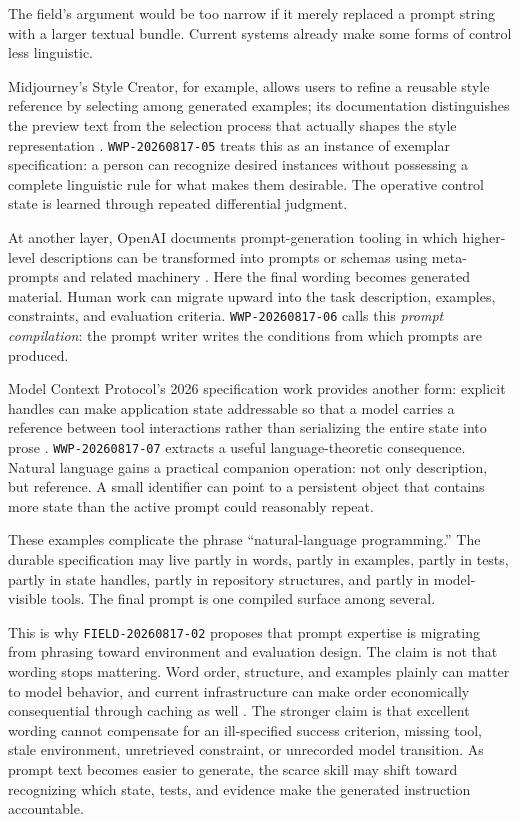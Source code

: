 \documentclass[11pt]{article}
\newcommand{\zettel}[1]{\texttt{#1}}
\begin{document}
The field's argument would be too narrow if it merely replaced a prompt string with a larger textual bundle. Current systems already make some forms of control less linguistic.

Midjourney's Style Creator, for example, allows users to refine a reusable style reference by selecting among generated examples; its documentation distinguishes the preview text from the selection process that actually shapes the style representation \cite{midjourney_style_creator}. \zettel{WWP-20260817-05} treats this as an instance of exemplar specification: a person can recognize desired instances without possessing a complete linguistic rule for what makes them desirable. The operative control state is learned through repeated differential judgment.

At another layer, OpenAI documents prompt-generation tooling in which higher-level descriptions can be transformed into prompts or schemas using meta-prompts and related machinery \cite{openai_prompt_generation}. Here the final wording becomes generated material. Human work can migrate upward into the task description, examples, constraints, and evaluation criteria. \zettel{WWP-20260817-06} calls this \emph{prompt compilation}: the prompt writer writes the conditions from which prompts are produced.

Model Context Protocol's 2026 specification work provides another form: explicit handles can make application state addressable so that a model carries a reference between tool interactions rather than serializing the entire state into prose \cite{soriaparra2026mcp}. \zettel{WWP-20260817-07} extracts a useful language-theoretic consequence. Natural language gains a practical companion operation: not only description, but reference. A small identifier can point to a persistent object that contains more state than the active prompt could reasonably repeat.

These examples complicate the phrase ``natural-language programming.'' The durable specification may live partly in words, partly in examples, partly in tests, partly in state handles, partly in repository structures, and partly in model-visible tools. The final prompt is one compiled surface among several.

This is why \zettel{FIELD-20260817-02} proposes that prompt expertise is migrating from phrasing toward environment and evaluation design. The claim is not that wording stops mattering. Word order, structure, and examples plainly can matter to model behavior, and current infrastructure can make order economically consequential through caching as well \cite{openai_prompt_caching}. The stronger claim is that excellent wording cannot compensate for an ill-specified success criterion, missing tool, stale environment, unretrieved constraint, or unrecorded model transition. As prompt text becomes easier to generate, the scarce skill may shift toward recognizing which state, tests, and evidence make the generated instruction accountable.
\end{document}
